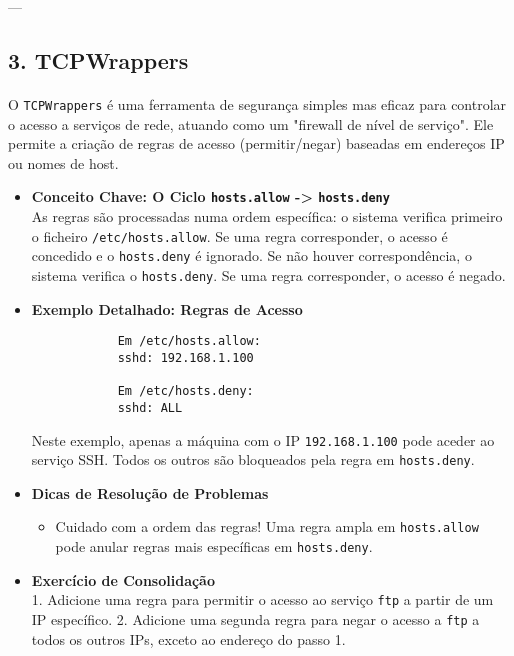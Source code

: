 \documentclass[10pt,a4paper]{article}
\begin{document}
	---
	
	\subsection*{3. TCPWrappers}
	\vspace{-1.2em}
	\paragraph{}
	O \texttt{TCPWrappers} é uma ferramenta de segurança simples mas eficaz para controlar o acesso a serviços de rede, atuando como um "firewall de nível de serviço". Ele permite a criação de regras de acesso (permitir/negar) baseadas em endereços IP ou nomes de host.
	
	\begin{itemize}
		\item \textbf{Conceito Chave: O Ciclo \texttt{hosts.allow} -> \texttt{hosts.deny}} \\
		As regras são processadas numa ordem específica: o sistema verifica primeiro o ficheiro \texttt{/etc/hosts.allow}. Se uma regra corresponder, o acesso é concedido e o \texttt{hosts.deny} é ignorado. Se não houver correspondência, o sistema verifica o \texttt{hosts.deny}. Se uma regra corresponder, o acesso é negado.
		
		\item \textbf{Exemplo Detalhado: Regras de Acesso} \\
		\begin{verbatim}
			Em /etc/hosts.allow:
			sshd: 192.168.1.100
			
			Em /etc/hosts.deny:
			sshd: ALL
		\end{verbatim}
		Neste exemplo, apenas a máquina com o IP \texttt{192.168.1.100} pode aceder ao serviço SSH. Todos os outros são bloqueados pela regra em \texttt{hosts.deny}.
		
		\item \textbf{Dicas de Resolução de Problemas} \\
		\begin{itemize}
			\item Cuidado com a ordem das regras! Uma regra ampla em \texttt{hosts.allow} pode anular regras mais específicas em \texttt{hosts.deny}.
		\end{itemize}
		
		\item \textbf{Exercício de Consolidação} \\
		1. Adicione uma regra para permitir o acesso ao serviço \texttt{ftp} a partir de um IP específico.
		2. Adicione uma segunda regra para negar o acesso a \texttt{ftp} a todos os outros IPs, exceto ao endereço do passo 1.
	\end{itemize}
	
\end{document}
